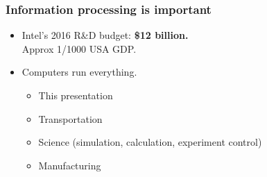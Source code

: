 \begin{frame}
\frametitle{Information processing is important}
\begin{itemize}
\item Intel's 2016 R\&D budget: \textbf{\$12 billion.}\\Approx 1/1000 USA GDP.
\pause
\item Computers run everything.
  \begin{itemize}
  \item This presentation
  \item Transportation
  \item Science (simulation, calculation, experiment control)
  \item Manufacturing
  \end{itemize}
\end{itemize}
\end{frame}
